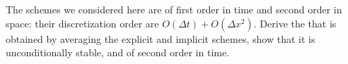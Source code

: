   \label{ex:crank}
  The schemes we considered here are of first order in time and second
  order in space: their discretization order are $O(\Delta t)+O(\Delta
  x^2)$. Derive the  that is obtained
  by averaging the explicit and implicit schemes, show that it is
  unconditionally stable, and of second order in time.
